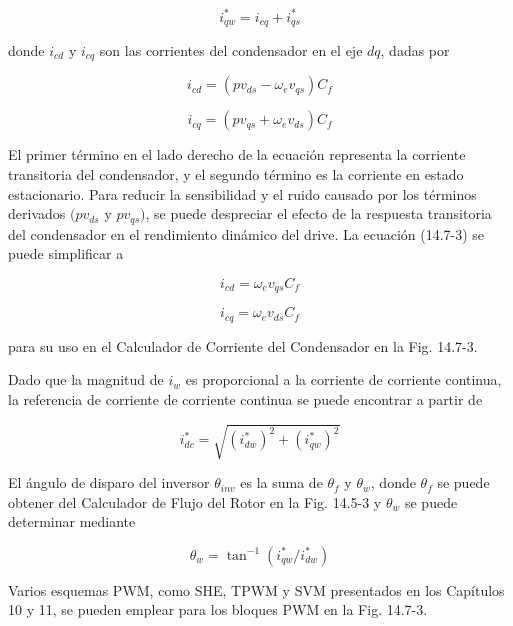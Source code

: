 \documentclass[letterpaper,12pt]{article}
\begin{document}
\begin{equation}
i_{qw}^* = i_{cq} + i_{qs}^* \tag{14.7-3}
\end{equation}

donde $i_{cd}$ y $i_{cq}$ son las corrientes del condensador en el eje $dq$, dadas por

\begin{equation}
i_{cd} = (p v_{ds} - \omega_e v_{qs}) C_f \tag{14.7-4}
\end{equation}

\begin{equation}
i_{cq} = (p v_{qs} + \omega_e v_{ds}) C_f \tag{14.7-5}
\end{equation}

El primer término en el lado derecho de la ecuación representa la corriente transitoria del condensador, y el segundo término es la corriente en estado estacionario. Para reducir la sensibilidad y el ruido causado por los términos derivados $(p v_{ds}$ y $p v_{qs})$, se puede despreciar el efecto de la respuesta transitoria del condensador en el rendimiento dinámico del drive. La ecuación (14.7-3) se puede simplificar a

\begin{equation}
i_{cd} = \omega_e v_{qs} C_f \tag{14.7-6}
\end{equation}

\begin{equation}
i_{cq} = \omega_e v_{ds} C_f \tag{14.7-7}
\end{equation}

para su uso en el Calculador de Corriente del Condensador en la Fig. 14.7-3.

Dado que la magnitud de $i_w$ es proporcional a la corriente de corriente continua, la referencia de corriente de corriente continua se puede encontrar a partir de

\begin{equation}
i_{dc}^* = \sqrt{(i_{dw}^*)^2 + (i_{qw}^*)^2} \tag{14.7-8}
\end{equation}

El ángulo de disparo del inversor $\theta_{inv}$ es la suma de $\theta_f$ y $\theta_w$, donde $\theta_f$ se puede obtener del Calculador de Flujo del Rotor en la Fig. 14.5-3 y $\theta_w$ se puede determinar mediante

\begin{equation}
\theta_w = \tan^{-1} (i_{qw}^* / i_{dw}^*) \tag{14.7-9}
\end{equation}

Varios esquemas PWM, como SHE, TPWM y SVM presentados en los Capítulos 10 y 11, se pueden emplear para los bloques PWM en la Fig. 14.7-3.
\end{document}

